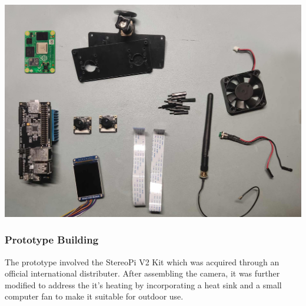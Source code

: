 \begin{center}
	\includegraphics[width=\textwidth]{Parts.png}
\end{center}



\subsubsection{Prototype Building}
The prototype involved the StereoPi V2 Kit which was acquired through an official international distributer. After assembling the camera, it was further modified to address the it's heating by incorporating a heat sink and a small computer fan to make it suitable for outdoor use.


